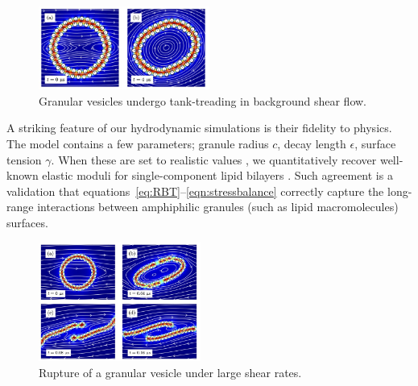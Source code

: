 \begin{figure}
\vspace{-5pt}
\includegraphics[width=0.5\textwidth]{figures/PreliminaryWork/TankTreading.jpg}
\vspace{-20pt}
\caption{\label{fig:JPv_linearshear} \footnotesize Granular vesicles
  undergo tank-treading in background shear flow.}
\end{figure}
%
A striking feature of our hydrodynamic simulations is their fidelity to
physics. The model contains a few parameters; granule radius $c$, decay
length $\epsilon$, surface tension $\gamma$. When these are set to
realistic values \cite{Fu2018_SIAM, ErLjCl89, Lin2005, Parsegian,
Israelachvili80, GarciaSaez, KUZMIN2005, Petelska2012,Jackson2016}, we
quantitatively recover well-known elastic moduli for
single-component lipid bilayers \cite{Nagle17, Nagle17-2,
LeVeWa14,NAGLE2000159}. Such agreement is a validation that
equations~\eqref{eq:RBT}--\eqref{eqn:stressbalance} correctly capture
the long-range interactions between amphiphilic granules (such as lipid
macromolecules) surfaces.
\begin{figure}
\vspace{-0pt}
\includegraphics[width=0.475\textwidth]{figures/PreliminaryWork/Rupture.jpg}
\vspace{-25pt}
\caption{\label{fig:JPv_rupture} \footnotesize Rupture of a granular
  vesicle under large shear rates.}
\end{figure}

